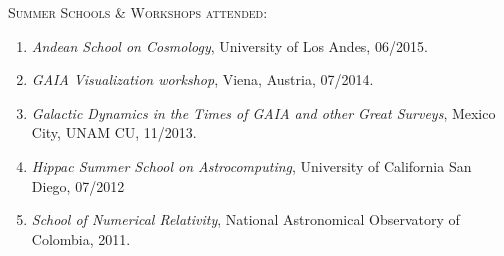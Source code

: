 \documentclass[letterpaper]{article}
\begin{document}
\textsc{\Large Summer Schools \& Workshops attended:}\\
\begin{enumerate}
\setlength\itemsep{0em} 
\item  \textit{Andean School on Cosmology}, University of Los Andes, 06/2015.\\
\item \textit{GAIA Visualization workshop}, Viena, Austria, 07/2014.\\
\item \textit{Galactic Dynamics in the Times of GAIA and other Great
Surveys}, Mexico City, UNAM CU, 11/2013.\\
\item \textit{Hippac Summer School on Astrocomputing}, University of California San Diego, 07/2012 \\
\item \textit{School of Numerical Relativity}, National Astronomical Observatory of Colombia, 2011.\\
\end{enumerate}
\end{document}
